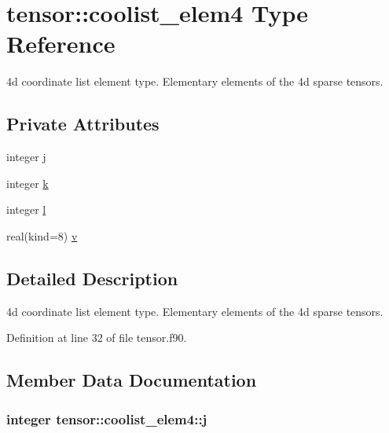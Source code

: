 \hypertarget{structtensor_1_1coolist__elem4}{}\section{tensor\+:\+:coolist\+\_\+elem4 Type Reference}
\label{structtensor_1_1coolist__elem4}


4d coordinate list element type. Elementary elements of the 4d sparse tensors.  


\subsection*{Private Attributes}
\begin{DoxyCompactItemize}
\item 
integer \hyperlink{structtensor_1_1coolist__elem4_a039f5f514a58974228639d78882bfdba}{j}
\item 
integer \hyperlink{structtensor_1_1coolist__elem4_a35a78377b28244593838a528944d073a}{k}
\item 
integer \hyperlink{structtensor_1_1coolist__elem4_a6ced083fe66923e717f1f91ed6f208b4}{l}
\item 
real(kind=8) \hyperlink{structtensor_1_1coolist__elem4_af68e0b1bb3ed0bbf0c135d4fc7475aba}{v}
\end{DoxyCompactItemize}


\subsection{Detailed Description}
4d coordinate list element type. Elementary elements of the 4d sparse tensors. 

Definition at line 32 of file tensor.\+f90.



\subsection{Member Data Documentation}
\subsubsection[{\texorpdfstring{j}{j}}]{\setlength{\rightskip}{0pt plus 5cm}integer tensor\+::coolist\+\_\+elem4\+::j\hspace{0.3cm}{\ttfamily [private]}}\hypertarget{structtensor_1_1coolist__elem4_a039f5f514a58974228639d78882bfdba}{}\label{structtensor_1_1coolist__elem4_a039f5f514a58974228639d78882bfdba}


